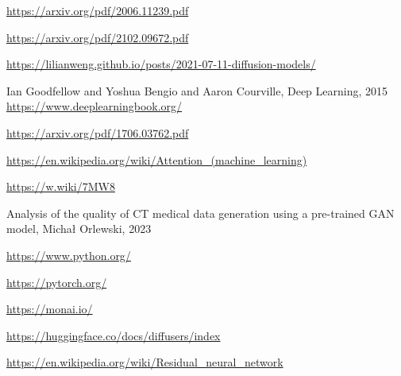 \documentclass[11pt,a4paper]{report}
\begin{document}
\begin{thebibliography}{99}

\url{https://arxiv.org/pdf/2006.11239.pdf}

\url{https://arxiv.org/pdf/2102.09672.pdf}

\url{ https://lilianweng.github.io/posts/2021-07-11-diffusion-models/}
  

Ian Goodfellow and Yoshua Bengio and Aaron Courville, Deep Learning, 2015
\url{https://www.deeplearningbook.org/}

\url{https://arxiv.org/pdf/1706.03762.pdf}

\url{https://en.wikipedia.org/wiki/Attention_(machine_learning)}

\url{https://w.wiki/7MW8}

Analysis of the quality of CT medical data generation using a pre-trained GAN model, Michał Orlewski, 2023

\url{https://www.python.org/}

\url{https://pytorch.org/}

\url{https://monai.io/}
  
\url{https://huggingface.co/docs/diffusers/index}

\url{https://en.wikipedia.org/wiki/Residual_neural_network}
  
\end{thebibliography}
\end{document}
